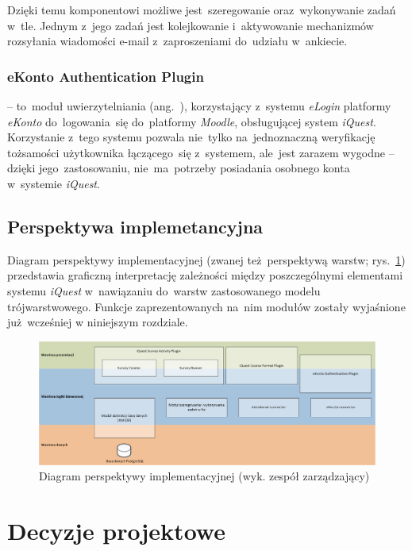 Dzięki temu komponentowi możliwe jest~szeregowanie oraz~wykonywanie zadań w~tle. Jednym z~jego zadań jest kolejkowanie i~aktywowanie mechanizmów rozsyłania wiadomości e-mail z~zaproszeniami do~udziału w~ankiecie.

\subsubsection{eKonto Authentication Plugin}
\label{Chapter5425}

 -- to~moduł uwierzytelniania (ang.~), korzystający z~systemu \textit{eLogin} platformy \textit{eKonto} do~logowania~się do~platformy \textit{Moodle}, obsługującej system \textit{iQuest}. Korzystanie z~tego systemu pozwala nie~tylko na~jednoznaczną weryfikację tożsamości użytkownika łączącego~się z~systemem, ale~jest zarazem wygodne -- dzięki jego~zastosowaniu, nie~ma~potrzeby posiadania osobnego konta w~systemie \textit{iQuest}.

\subsection{Perspektywa implemetancyjna}
\label{Chapter543}

Diagram perspektywy implementacyjnej (zwanej też~perspektywą warstw; rys.~\ref{rys:PerspektywaImplementacyjna}) przedstawia graficzną interpretację zależności między poszczególnymi elementami systemu \textit{iQuest} w~nawiązaniu do~warstw zastosowanego modelu trójwarstwowego. Funkcje zaprezentowanych na~nim modułów zostały wyjaśnione już~wcześniej w niniejszym rozdziale.

\begin{figure}[H]
\centering\includegraphics[angle=90,height=\textheight]{figures/Layers}
\caption{Diagram perspektywy implementacyjnej (wyk. zespół zarządzający)}\label{rys:PerspektywaImplementacyjna}
\end{figure}

\section{Decyzje projektowe}
\label{Chapter55}

